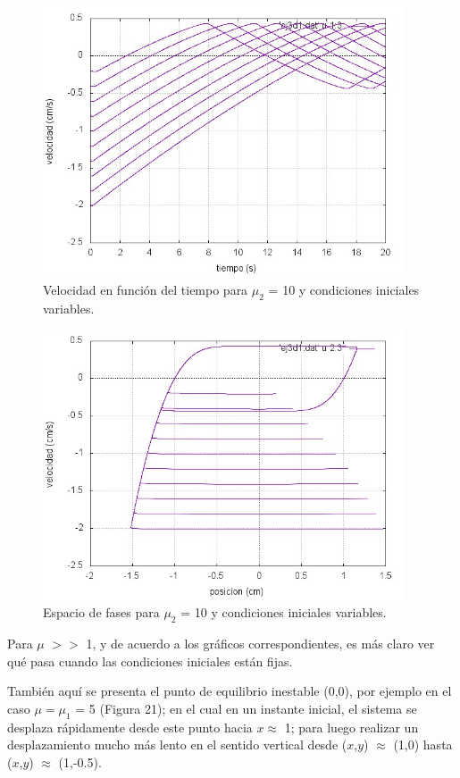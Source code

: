 \documentclass[a4paper,12pt]{article}
\begin{document}
\begin{itemize}
\begin{figure}[H]
\begin{center}
\includegraphics[height=8cm]{grafico_ej3d1_vVSt.jpg}
\caption[width=5cm]{Velocidad en funci\'on del tiempo para $\mu_2$ = 10 y condiciones iniciales variables.}
\end{center}
\end{figure}

\begin{figure}[H]
\begin{center}
\includegraphics[height=8cm]{grafico_ej3d1_xVSv.jpg}
\caption[width=5cm]{Espacio de fases para $\mu_2$ = 10 y condiciones iniciales variables.}
\end{center}
\end{figure}


Para $\mu$ $>>$ 1, y de acuerdo a los gr\'aficos correspondientes, es m\'as claro ver qu\'e pasa cuando las condiciones iniciales est\'an fijas.

Tambi\'en aqu\'i se presenta el punto de equilibrio inestable (0,0), por ejemplo en el caso $\mu = \mu_1$ = 5 (Figura 21); en el cual en un instante inicial, el sistema se desplaza r\'apidamente desde este punto hacia $x \approx$ 1; para luego realizar un desplazamiento mucho m\'as lento en el sentido vertical desde ($x$,$y$) $\approx$ (1,0) hasta ($x$,$y$) $\approx$ (1,-0.5).


\end{itemize}
\end{document}
